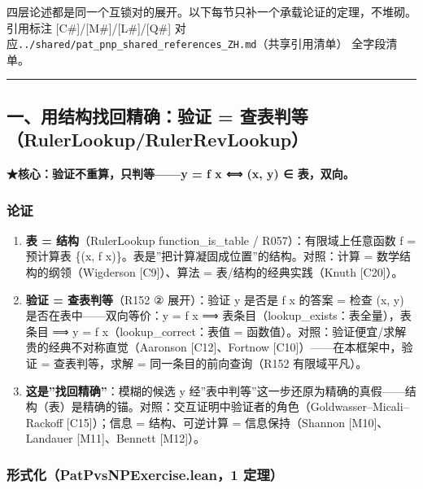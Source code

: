 \documentclass[
]{article}
\providecommand{\tightlist}{%
 \setlength{\itemsep}{0pt}\setlength{\parskip}{0pt}}
\begin{document}
四层论述都是同一个互锁对的展开。以下每节只补一个承载论证的定理，不堆砌。引用标注
{[}C\#{]}/{[}M\#{]}/{[}L\#{]}/{[}Q\#{]}
对应\texttt{../shared/pat\_pnp\_shared\_references\_ZH.md}（共享引用清单）
全字段清单。

\begin{center}\rule{0.5\linewidth}{0.5pt}\end{center}

\subsection{一、用结构找回精确：验证 =
查表判等（RulerLookup/RulerRevLookup）}\label{ux4e00ux7528ux7ed3ux6784ux627eux56deux7cbeux786eux9a8cux8bc1-ux67e5ux8868ux5224ux7b49rulerlookuprulerrevlookup}

\textbf{★核心：验证不重算，只判等------y = f x ⟺ (x, y) ∈ 表，双向。}

\subsubsection{论证}\label{ux8bbaux8bc1}

\begin{enumerate}
\def\labelenumi{\arabic{enumi}.}
\tightlist
\item
 \textbf{表 = 结构}（RulerLookup function\_is\_table /
 R057）：有限域上任意函数 f = 预计算表 \{(x, f
 x)\}。表是''把计算凝固成位置''的结构。对照：计算 =
 数学结构的纲领（Wigderson {[}C9{]}）、算法 = 表/结构的经典实践（Knuth
 {[}C20{]}）。
\item
 \textbf{验证 = 查表判等}（R152 ② 展开）：验证 y 是否是 f x 的答案 =
 检查 (x, y) 是否在表中------双向等价：y = f x ⟹
 表条目（lookup\_exists：表全量），表条目 ⟹ y = f
 x（lookup\_correct：表值 =
 函数值）。对照：验证便宜/求解贵的经典不对称直觉（Aaronson
 {[}C12{]}、Fortnow {[}C10{]}）------在本框架中，验证 = 查表判等，求解
 = 同一条目的前向查询（R152 有限域平凡）。
\item
 \textbf{这是''找回精确''}：模糊的候选 y
 经''表中判等''这一步还原为精确的真假------结构（表）是精确的锚。对照：交互证明中验证者的角色（Goldwasser--Micali--Rackoff
 {[}C15{]}）；信息 = 结构、可逆计算 = 信息保持（Shannon
 {[}M10{]}、Landauer {[}M11{]}、Bennett {[}M12{]}）。
\end{enumerate}

\subsubsection{形式化（PatPvsNPExercise.lean，1
定理）}\label{ux5f62ux5f0fux5316patpvsnpexercise.lean1-ux5b9aux7406}
\end{document}
